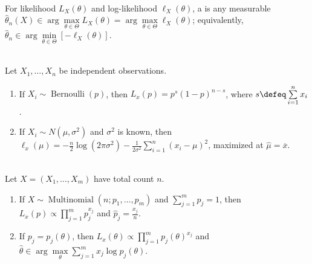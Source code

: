 \begin{definition} \label{def:maximum-likelihood-estimator} \\
For likelihood $L_X(\theta)$ and log-likelihood $\ell_X(\theta)$, a  is any measurable\\
$\widehat{\theta}_n(X)\in\arg\max\limits_{\theta\in\Theta}L_X(\theta)=\arg\max\limits_{\theta\in\Theta}\ell_X(\theta)$; equivalently, $\widehat{\theta}_n\in\arg\min\limits_{\theta\in\Theta}[-\ell_X(\theta)]$.
\end{definition}

\begin{example} \label{ex:bernoulli-and-normal-likelihoods} \\
Let $X_1,\ldots,X_n$ be independent observations.
\begin{enumerate}[label=(\roman*)]
\setlength{\itemsep}{0pt}
\item If $X_i\sim\operatorname{Bernoulli}(p)$, then $L_x(p)=p^{s}(1-p)^{n-s}$, where $s\defeq\sum\limits_{i=1}^{n}x_i$.
\item If $X_i\sim N(\mu,\sigma^2)$ and $\sigma^2$ is known, then $\ell_x(\mu)=-\frac{n}{2}\log(2\pi\sigma^2)-\frac{1}{2\sigma^2}\sum\limits_{i=1}^{n}(x_i-\mu)^2$, maximized at $\widehat{\mu}=\overline{x}$.
\end{enumerate}
\end{example}

\begin{example} \label{ex:multinomial-cell-probability-likelihood} \\
Let $X=(X_1,\ldots,X_m)$ have total count $n$.
\begin{enumerate}[label=(\roman*)]
\setlength{\itemsep}{0pt}
\item If $X\sim\operatorname{Multinomial}(n;p_1,\ldots,p_m)$ and $\sum\limits_{j=1}^{m}p_j=1$, then $L_x(p)\propto\prod\limits_{j=1}^{m}p_j^{x_j}$ and $\widehat{p}_j=\frac{x_j}{n}$.
\item If $p_j=p_j(\theta)$, then $L_x(\theta)\propto\prod\limits_{j=1}^{m}p_j(\theta)^{x_j}$ and $\widehat{\theta}\in\arg\max\limits_\theta\sum\limits_{j=1}^{m}x_j\log p_j(\theta)$.
\end{enumerate}
\end{example}

